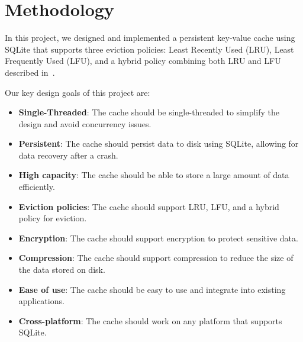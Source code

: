 \section{Methodology\label{sec:methodology}}

In this project, we designed and implemented a
persistent key-value cache using SQLite
that supports three eviction policies: Least Recently Used (LRU),
Least Frequently Used (LFU), and a hybrid policy combining both LRU and LFU
described in~\cite{shah2023ImprovedCacheEviction}.


Our key design goals of this project are:
\begin{itemize}
    \item \textbf{Single-Threaded}: The cache should be single-threaded to simplify the design and avoid concurrency issues.
    \item \textbf{Persistent}: The cache should persist data to disk using SQLite, allowing for data recovery after a crash.
    \item \textbf{High capacity}: The cache should be able to store a large amount of data efficiently.
    \item \textbf{Eviction policies}: The cache should support LRU, LFU, and a hybrid policy for eviction.
    \item \textbf{Encryption}: The cache should support encryption to protect sensitive data.
    \item \textbf{Compression}: The cache should support compression to reduce the size of the data stored on disk.
    \item \textbf{Ease of use}: The cache should be easy to use and integrate into existing applications.
    \item \textbf{Cross-platform}: The cache should work on any platform that supports SQLite.
\end{itemize}

